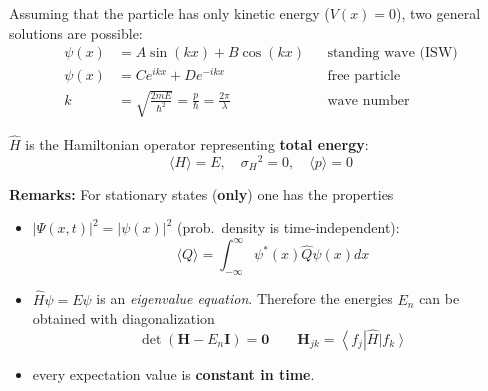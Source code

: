 \newpar{}
Assuming that the particle has only kinetic energy ($V(x) = 0$), two general solutions are possible:
\noindent\begin{align*}
    \psi(x) & =A\sin(kx)+B\cos(kx)                                               &  & \text{standing wave (ISW)} \\
    \psi(x) & =Ce^{ikx}+De^{-ikx}                                                &  & \text{free particle}       \\
    k       & =\sqrt{\frac{2mE}{\hbar^{2}}}=\frac{p}{\hbar}=\frac{2\pi}{\lambda} &  & \text{wave number}
\end{align*}


$\widehat{H}$ is the Hamiltonian operator representing \textbf{total energy}:
\noindent\begin{equation*}
    \langle H\rangle = E,\quad{\sigma_H}^2 = 0, \quad \langle p\rangle = 0
\end{equation*}

\newpar{}

\textbf{Remarks:}
For stationary states (\textbf{only}) one has the properties
\begin{itemize}
    \item $|\Psi(x,t)|^2 = |\psi(x)|^2$ (prob.\ density is time-independent):
          \noindent\begin{equation*}
              \langle Q\rangle=\int_{-\infty}^\infty\psi^*(x)\widehat{Q}\psi(x)dx
          \end{equation*}
    \item $\widehat{H}\psi = E\psi$ is an \textit{eigenvalue equation}. Therefore the energies $E_n$ can be obtained with diagonalization
          \noindent\begin{equation*}
              \det\left(\mathbf{H}-E_n \mathbf{I}\right) = \mathbf{0} \qquad \mathbf{H}_{jk} = \left\langle f_j\right|\widehat{H}\left|f_k \right\rangle
          \end{equation*}
    \item every expectation value is \textbf{constant in time}.
\end{itemize}

